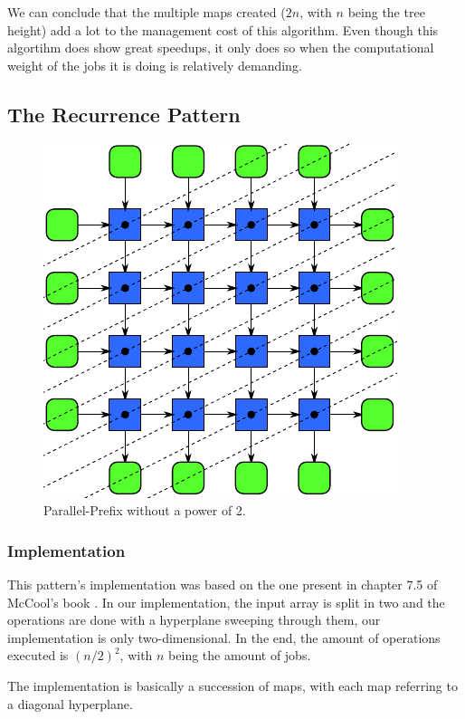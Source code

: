 \documentclass[10pt,journal]{IEEEtran}
\begin{document}
We can conclude that the multiple maps created ($ 2n $, with $ n $ being the tree height) add a lot to the management cost of this algorithm. Even though this algortihm does show great speedups, it only does so when the computational weight of the jobs it is doing is relatively demanding.

\subsection{The Recurrence Pattern}

\begin{figure}[htbp]
	\centerline{\includegraphics[scale=0.25]{img/recurrence.png}}
	\caption{ Parallel-Prefix without a power of 2. }
	\label{parprefix}
\end{figure}

\subsubsection{Implementation}

This pattern's implementation was based on the one present in chapter 7.5 of McCool's book \cite{mccool}. In our implementation, the input array is split in two and the operations are done with a hyperplane sweeping through them, our implementation is only two-dimensional. In the end, the amount of operations executed is $ (n / 2)^2 $, with $ n $ being the amount of jobs. 

The implementation is basically a succession of maps, with each map referring to a diagonal hyperplane. 
\end{document}
